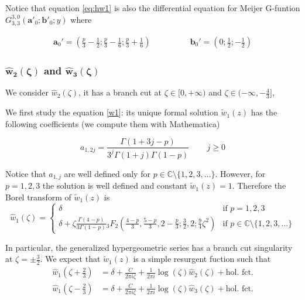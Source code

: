\documentclass{article}
\newcommand{\C}{\mathbb{C}}
\begin{document}
Notice that equation \eqref{eq:hw1} is also the differential equation for Meijer G-funtion $G_{3,3}^{3,0}(\mathbf{a}'_0;\mathbf{b}'_0;y)$ where 

\begin{align*}
\mathbf{a}_0'=\left(\frac{p}{3}-\frac{1}{2};\frac{p}{3}-\frac{1}{6};\frac{p}{3}+\frac{1}{6}\right) & \qquad\qquad \mathbf{b}_0'=\left(0;\frac{1}{2};-\frac{1}{2}\right)
\end{align*}

\subsubsection{$\mathbf{\hat{w}_2(\zeta)}$ and $\mathbf{\hat{w}_3(\zeta)}$}

We consider $\hat{w}_2(\zeta)$, it has a branch cut at $\zeta\in [0,+\infty)$ and $\zeta\in(-\infty,-\tfrac{4}{3}]$,  

 


\color{red}
We first study the equation \eqref{w1}: its unique formal solution $\tilde{w}_1(z)$ has the following coefficients (we compute them with Mathematica)

\begin{equation}
a_{1,2j}=\frac{\Gamma\left(1+3j-p\right)}{3^j\Gamma(1+j)\Gamma(1-p)} \,\qquad j\geq 0
\end{equation}

Notice that $a_{1,j}$ are well defined only for $p\in\C\setminus\lbrace 1,2,3,...\rbrace$. However, for $p=1,2,3$ the solution is well defined and constant $\tilde{w}_1(z)=1$. Therefore the Borel transform of $\tilde{w}_1(z)$ is 
\begin{equation}
\hat{w}_1(\zeta)=\begin{cases}
\delta & \text{if } p=1,2,3 \\
\delta+\zeta\frac{\Gamma(4-p)}{3\Gamma(1-p)}{}_3F_2\left(\frac{4-p}{3},\frac{5-p}{3},2-\frac{p}{3};\frac{3}{2},2;\frac{9}{4}\zeta^2\right) & \text{if } p\in\C\setminus\lbrace 1,2,3,...\rbrace
\end{cases}
\end{equation}

In particular, the generalized hypergeometric series has a branch cut singularity at $\zeta=\pm\tfrac{3}{2}$. We expect that $\tilde{w}_1(z)$ is a simple resurgent fuction such that 
\begin{align*}
\hat{w}_1(\zeta+\tfrac{2}{3})&=\delta+\frac{C}{2\pi i\zeta}+\frac{1}{2\pi i}\log(\zeta)\hat{w}_2(\zeta)+\text{hol. fct.}\\
\hat{w}_1(\zeta-\tfrac{2}{3})&=\delta+\frac{C}{2\pi i\zeta}+\frac{1}{2\pi i}\log(\zeta)\hat{w}_3(\zeta)+\text{hol. fct.}
\end{align*}
\end{document}
